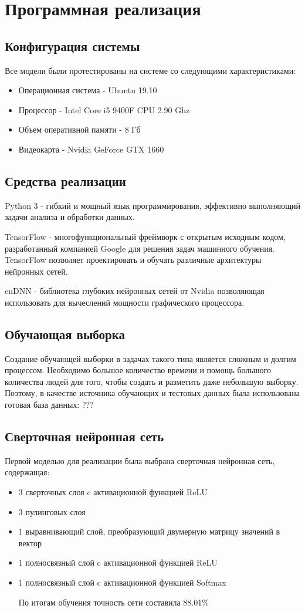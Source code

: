 \section{Программная реализация}

\subsection{Конфигурация системы}
Все модели были протестированы на системе со следующими характеристиками:
\begin{itemize}
  \item Операционная система - Ubuntu 19.10
  \item Процессор - Intel Core i5 9400F CPU 2.90 Ghz
  \item Объем оперативной памяти - 8 Гб
  \item Видеокарта - Nvidia GeForce GTX 1660
\end{itemize}

\subsection{Средства реализации}
Python 3 - гибкий и мощный язык программирования, эффективно выполняющий задачи анализа и обработки данных. 

TensorFlow - многофункциональный фреймворк с открытым исходным кодом, разработанный компанией Google для решения задач машинного обучения. TensorFlow позволяет проектировать и обучать различные архитектуры нейронных сетей.

cuDNN - библиотека глубоких нейронных сетей от Nvidia позволяющая использовать для вычеслений мощности графического процессора. 
\subsection{Обучающая выборка}
Создание обучающей выборки в задачах такого типа является сложным
и долгим процессом. Необходимо большое количество времени и помощь
большого количества людей для того, чтобы создать и разметить
даже небольшую выборку.
Поэтому, в качестве источника обучающих и тестовых данных была использована готовая база данных: ???

\subsection{Сверточная нейронная сеть}
Первой моделью для реализации была выбрана сверточная нейронная сеть, содержащая:
\begin{itemize}
  \item 3 сверточных слоя c активационной функцией ReLU
  \item 3 пулинговых слоя
  \item 1 выравнивающий слой, преобразующий двумерную матрицу значений в вектор
  \item 1 полносвязный слой c активационной функцией ReLU
  \item 1 полносвязный слой c активационной функцией Softmax

  По итогам обучения точность сети составила 88.01\%
\end{itemize}
